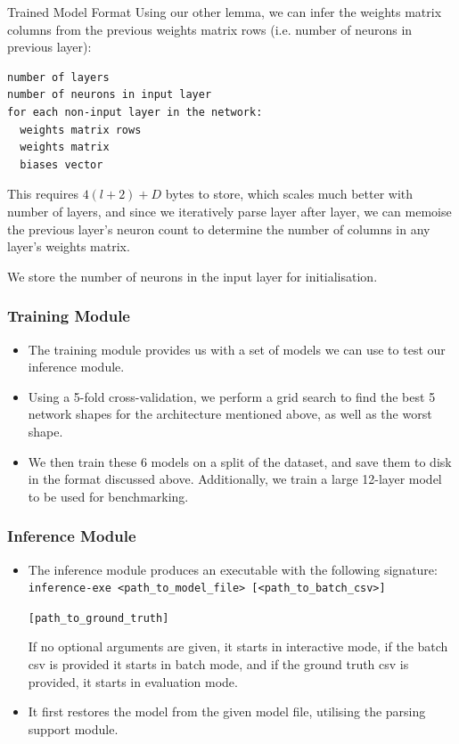 \documentclass{beamer}
\begin{document}
\begin{frame}[fragile]{Trained Model Format}
  Using our other lemma, we can infer the weights matrix columns from the previous weights matrix rows (i.e. number of neurons in previous layer):
  \begin{verbatim}
number of layers
number of neurons in input layer
for each non-input layer in the network:
  weights matrix rows
  weights matrix
  biases vector
\end{verbatim}
  This requires $4(l + 2) + D$ bytes to store, which scales much better with number of layers, and since we iteratively parse layer after layer, we can memoise the previous layer's neuron count to determine the number of columns in any layer's weights matrix.

  We store the number of neurons in the input layer for initialisation.
\end{frame}

\begin{frame}
  \frametitle{Training Module}

  \begin{itemize}
    \item The training module provides us with a set of models we can use to test our inference module.
    \item<2-> Using a 5-fold cross-validation, we perform a grid search to find the best 5 network shapes for the architecture mentioned above, as well as the worst shape.
    \item<3-> We then train these 6 models on a split of the dataset, and save them to disk in the format discussed above. Additionally, we train a large 12-layer model to be used for benchmarking.
  \end{itemize}

\end{frame}

\begin{frame}[fragile]
  \frametitle{Inference Module}

  \begin{itemize}
    \item The inference module produces an executable with the following signature: \verb|inference-exe <path_to_model_file> [<path_to_batch_csv>]| 
    
    \verb|[path_to_ground_truth]|

    If no optional arguments are given, it starts in interactive mode, if the batch csv is provided it starts in batch mode, and if the ground truth csv is provided, it starts in evaluation mode.
    \item<2-> It first restores the model from the given model file, utilising the parsing support module.
  \end{itemize}
\end{frame}
\end{document}
